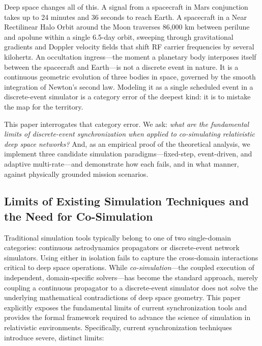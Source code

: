 \documentclass[a4paper,fleqn]{cas-sc}
\begin{document}
Deep space changes all of this. A signal from a spacecraft in Mars conjunction takes up to 24 minutes and 36 seconds to reach Earth. A spacecraft in a Near Rectilinear Halo Orbit around the Moon traverses 86,000 km between perilune and apolune within a single 6.5-day orbit, sweeping through gravitational gradients and Doppler velocity fields that shift RF carrier frequencies by several kilohertz. An occultation ingress---the moment a planetary body interposes itself between the spacecraft and Earth---is not a discrete event in nature. It is a continuous geometric evolution of three bodies in space, governed by the smooth integration of Newton's second law. Modeling it as a single scheduled event in a discrete-event simulator is a category error of the deepest kind: it is to mistake the map for the territory.

This paper interrogates that category error. We ask: \textit{what are the fundamental limits of discrete-event synchronization when applied to co-simulating relativistic deep space networks?} And, as an empirical proof of the theoretical analysis, we implement three candidate simulation paradigms---fixed-step, event-driven, and adaptive multi-rate---and demonstrate how each fails, and in what manner, against physically grounded mission scenarios.

\subsection{Limits of Existing Simulation Techniques and the Need for Co-Simulation}
Traditional simulation tools typically belong to one of two single-domain categories: continuous astrodynamics propagators or discrete-event network simulators. Using either in isolation fails to capture the cross-domain interactions critical to deep space operations. While \textit{co-simulation}---the coupled execution of independent, domain-specific solvers---has become the standard approach, merely coupling a continuous propagator to a discrete-event simulator does not solve the underlying mathematical contradictions of deep space geometry. This paper explicitly exposes the fundamental limits of current synchronization tools and provides the formal framework required to advance the science of simulation in relativistic environments. Specifically, current synchronization techniques introduce severe, distinct limits:
\end{document}
